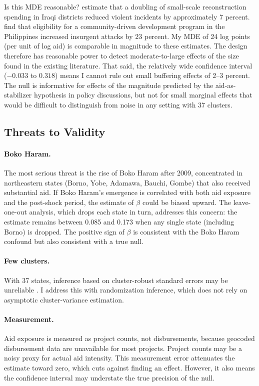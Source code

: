 \documentclass[12pt]{article}
\begin{document}
Is this MDE reasonable? \citet{berman2011can} estimate that a doubling of small-scale reconstruction spending in Iraqi districts reduced violent incidents by approximately 7 percent. \citet{crost2014aid} find that eligibility for a community-driven development program in the Philippines increased insurgent attacks by 23 percent. My MDE of 24 log points (per unit of log aid) is comparable in magnitude to these estimates. The design therefore has reasonable power to detect moderate-to-large effects of the size found in the existing literature. That said, the relatively wide confidence interval ($-0.033$ to $0.318$) means I cannot rule out small buffering effects of 2--3 percent. The null is informative for effects of the magnitude predicted by the aid-as-stabilizer hypothesis in policy discussions, but not for small marginal effects that would be difficult to distinguish from noise in any setting with 37 clusters.

\subsection{Threats to Validity}

\paragraph{Boko Haram.} The most serious threat is the rise of Boko Haram after 2009, concentrated in northeastern states (Borno, Yobe, Adamawa, Bauchi, Gombe) that also received substantial aid. If Boko Haram's emergence is correlated with both aid exposure and the post-shock period, the estimate of $\beta$ could be biased upward. The leave-one-out analysis, which drops each state in turn, addresses this concern: the estimate remains between 0.085 and 0.173 when any single state (including Borno) is dropped. The positive sign of $\beta$ is consistent with the Boko Haram confound but also consistent with a true null.

\paragraph{Few clusters.} With 37 states, inference based on cluster-robust standard errors may be unreliable \citep{cameron2008bootstrap}. I address this with randomization inference, which does not rely on asymptotic cluster-variance estimation.

\paragraph{Measurement.} Aid exposure is measured as project counts, not disbursements, because geocoded disbursement data are unavailable for most projects. Project counts may be a noisy proxy for actual aid intensity. This measurement error attenuates the estimate toward zero, which cuts against finding an effect. However, it also means the confidence interval may understate the true precision of the null.
\end{document}
